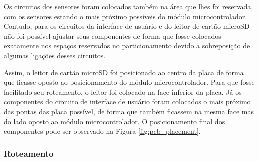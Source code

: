 Os circuitos dos sensores foram colocados também na área que lhes foi reservada, com os sensores estando o mais próximo possíveis do módulo microcontrolador. Contudo, para os circuitos da interface de usuário e do leitor de cartão microSD não foi possível ajustar seus componentes de forma que fosse colocados exatamente nos espaços reservados no particionamento devido a sobreposição de algumas ligações desses circuitos.

Assim, o leitor de cartão microSD foi posicionado ao centro da placa de forma que ficasse oposto ao posicionamento do módulo microcontrolador. Para que fosse facilitado seu roteamento, o leitor foi colocado na face inferior da placa. Já os componentes do circuito de interface de usuário foram colocados o mais próximo das pontas das placa possível, de forma que também ficassem na mesma face mas do lado oposto ao módulo microcontrolador. O posicionamento final dos componentes pode ser observado na Figura \ref{fig:pcb_placement}.

    \begin{figure}[h!]
            \captionsetup{width=10cm}
   \end{figure}



\subsubsection{Roteamento}

